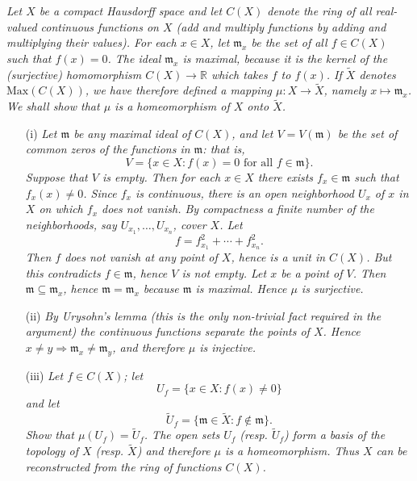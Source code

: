 \documentclass{article}
\begin{document}
\emph{Let $X$ be a compact Hausdorff space and
let $C(X)$ denote the ring of all real-valued continuous functions on $X$
(add and multiply functions by adding and multiplying their values).
For each $x \in X$, let $\mathfrak{m}_x$ be the set of all $f \in C(X)$ such that $f(x) = 0$.
The ideal $\mathfrak{m}_x$ is maximal,
because it is the kernel of the (surjective) homomorphism $C(X) \to \mathbb{R}$ which takes $f$ to $f(x)$.
If $\widetilde{X}$ denotes $\mathrm{Max}(C(X))$,
we have therefore defined a mapping $\mu: X \to \widetilde{X}$,
namely $x \mapsto \mathfrak{m}_x$.} \\

\emph{We shall show that $\mu$ is a homeomorphism of $X$ onto $\widetilde{X}$.}
\begin{enumerate}
\item[(i)]
  \emph{Let $\mathfrak{m}$ be any maximal ideal of $C(X)$,
  and let $V = V(\mathfrak{m})$ be the set of common zeros of the functions in $\mathfrak{m}$:
  that is,
  \[
    V = \{ x \in X : f(x) = 0 \text{ for all } f \in \mathfrak{m} \}.
  \]
  Suppose that $V$ is empty.
  Then for each $x \in X$ there exists $f_x \in \mathfrak{m}$ such that $f_x(x) \neq 0$.
  Since $f_x$ is continuous,
  there is an open neighborhood $U_x$ of $x$ in $X$ on which $f_x$ does not vanish.
  By compactness a finite number of the neighborhoods, say $U_{x_1}, \ldots, U_{x_n}$, cover $X$.
  Let
  \[
    f = f_{x_1}^2 + \cdots + f_{x_n}^2.
  \]
  Then $f$ does not vanish at any point of $X$, hence is a unit in $C(X)$.
  But this contradicts $f \in \mathfrak{m}$, hence $V$ is not empty.
  Let $x$ be a point of $V$. Then $\mathfrak{m} \subseteq \mathfrak{m}_x$,
  hence $\mathfrak{m} = \mathfrak{m}_x$ because $\mathfrak{m}$ is maximal.
  Hence $\mu$ is surjective.}

\item[(ii)]
  \emph{By Urysohn's lemma (this is the only non-trivial fact required in the argument)
  the continuous functions separate the points of $X$.
  Hence $x \neq y \Longrightarrow \mathfrak{m}_x \neq \mathfrak{m}_y$, and therefore $\mu$ is injective.}

\item[(iii)]
  \emph{Let $f \in C(X)$; let
  \[
    U_f = \{ x \in X : f(x) \neq 0 \}
  \]
  and let
  \[
    \widetilde{U}_f = \{ \mathfrak{m} \in \widetilde{X} : f \not\in \mathfrak{m} \}.
  \]
  Show that $\mu(U_f) = \widetilde{U}_f$.
  The open sets $U_f$ (resp. $\widetilde{U}_f$)
  form a basis of the topology of $X$ (resp. $\widetilde{X}$) and therefore $\mu$ is a homeomorphism.
  Thus $X$ can be reconstructed from the ring of functions $C(X)$.}
\end{enumerate}
\end{document}
